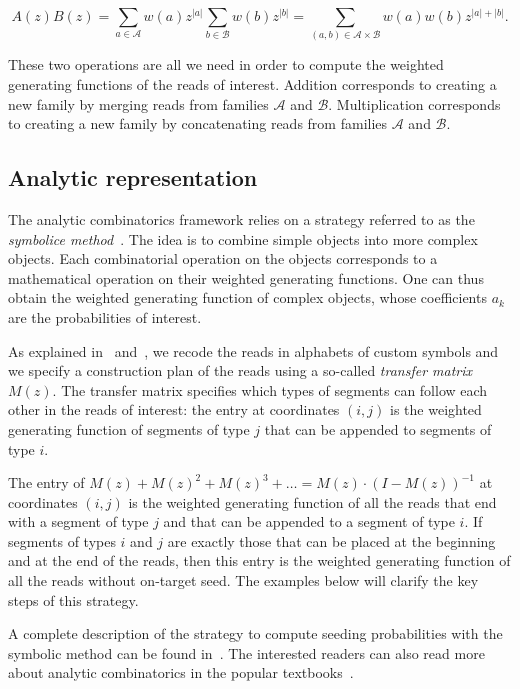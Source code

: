 \documentclass{article}
\begin{document}
\begin{equation*}
A(z)B(z) =
\sum_{a\in \mathcal{A}}w(a)z^{|a|} \sum_{b\in \mathcal{B}}w(b)z^{|b|}
= \sum_{(a,b) \in \mathcal{A} \times \mathcal{B}} w(a)w(b)z^{|a|+|b|}.
\end{equation*}

These two operations are all we need in order to compute the weighted
generating functions of the reads of interest. Addition corresponds to
creating a new family by merging reads from families $\mathcal{A}$ and
$\mathcal{B}$. Multiplication corresponds to creating a new family by
concatenating reads from families $\mathcal{A}$ and $\mathcal{B}$.

\subsection{Analytic representation}

The analytic combinatorics framework relies on a strategy referred to as
the \emph{symbolice method}~\cite{sedgewick2013introduction}. The idea is
to combine simple objects into more complex objects. Each combinatorial
operation on the objects corresponds to a mathematical operation on their
weighted generating functions. One can thus obtain the weighted generating
function of complex objects, whose coefficients $a_k$ are the
probabilities of interest.

As explained in~\cite{filion2017analytic} and~\cite{filion2018analytic},
we recode the reads in alphabets of custom symbols and we specify a
construction plan of the reads using a so-called \emph{transfer matrix}
$M(z)$. The transfer matrix specifies which types of segments can follow
each other in the reads of interest: the entry at coordinates $(i,j)$ is
the weighted generating function of segments of type $j$ that can be
appended to segments of type $i$.

The entry of $M(z) + M(z)^2 + M(z)^3 + \ldots = M(z) \cdot (I-M(z))^{-1}$
at coordinates $(i,j)$ is the weighted generating function of all the
reads that end with a segment of type $j$ and that can be appended to a
segment of type $i$. If segments of types $i$ and $j$ are exactly those
that can be placed at the beginning and at the end of the reads, then this
entry is the weighted generating function of all the reads without
on-target seed. The examples below will clarify the key steps of this
strategy.

A complete description of the strategy to compute seeding probabilities
with the symbolic method can be found in~\cite{filion2017analytic,
filion2018analytic}. The interested readers can also read more about
analytic combinatorics in the popular
textbooks~\cite{flajolet2009analytic, sedgewick2013introduction}.
\end{document}
